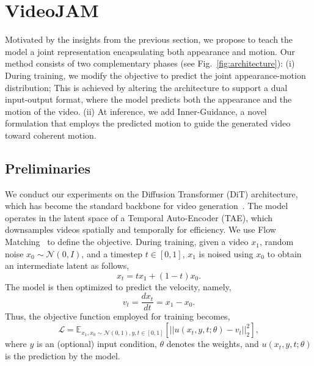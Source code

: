 \section{VideoJAM}
\label{sec:method}
Motivated by the insights from the previous section, we propose to teach the model a joint representation encapsulating both appearance and motion. 
Our method consists of two complementary phases (see Fig.~\ref{fig:architecture}): (i) During training, we modify the objective to predict the joint appearance-motion distribution; This is achieved by altering the architecture to support a dual input-output format, where the model predicts both the appearance and the motion of the video. (ii) At inference, we add Inner-Guidance, a novel formulation that employs the predicted motion to guide the generated  video toward coherent motion.


\vspace{-0.2cm}
\subsection{Preliminaries}
\label{sec:preliminaries}
We conduct our experiments on the Diffusion Transformer (DiT) architecture, which has become the standard backbone for video generation~\cite{sora,genmo2024mochi}. The model operates in the latent space of a Temporal Auto-Encoder (TAE), which downsamples videos spatially and temporally for efficiency. We use Flow Matching~\cite{flow-matching} to define the objective. During training, given a video $x_1$, random noise $x_0 \sim \mathcal{N}(0,I)$, and a timestep $t \in [0,1]$, $x_1$ is noised using $x_0$ to obtain an intermediate latent as follows,
\begin{equation}
    x_t = tx_1 + \left(1- t\right)x_0.
    \label{eq:linear}
\end{equation}
The model is then optimized to predict the velocity, namely,
\begin{equation}
    v_t = \frac{dx_t}{dt}=x_1 - x_0.
    \label{eq:velocity}
\end{equation}
Thus, the objective function employed for training becomes,
\begin{equation}
    \mathcal{L} = \mathbb{E}_{x_1,x_0\sim\mathcal{N}(0,1),y,t\in [0,1]} \left [ || u(x_t, y, t; \theta) - v_t ||_2^2 \right ],
    \label{eq:clean_objective}
\end{equation}
where $y$ is an (optional) input condition, $\theta$ denotes the weights, and $u(x_t, y, t; \theta)$ is the prediction by the model. 

